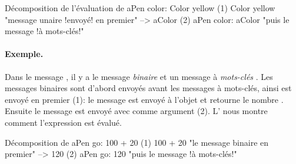 \documentclass[a4paper,10pt,twoside]{book}
\begin{document}
\begin{example}[decColor]{D\'ecomposition de l'\'evaluation de }{}
        aPen color: Color yellow
(1)                       Color yellow        "message unaire !envoy\'e! en premier"
                        --> aColor
(2)   aPen color: aColor                 "puis le message !\`a mots-cl\'es!"
\end{example}

\paragraph{Exemple.} Dans le message , il y a le message \emph{binaire}  et un message \`a \emph{mots-cl\'es} . Les messages binaires sont d'abord envoy\'es avant les messages \`a mots-cl\'es, ainsi  est envoy\'e en premier (1): le message  est envoy\'e \`a l'objet  et retourne le nombre . Ensuite le message  est envoy\'e avec comme argument  (2).
L' nous montre comment l'expression est \'evalu\'e. 

\begin{example}[decGo]{D\'ecomposition de }{}
      aPen go: 100 + 20   
(1)                 100 + 20           "le message binaire en premier"
                   -->   120
(2)  aPen go: 120                   "puis le message !\`a mots-cl\'es!"
\end{example}
\end{document}
